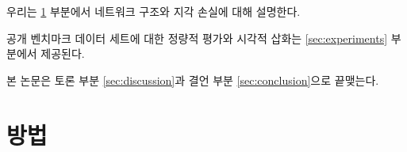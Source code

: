 \documentclass[10pt,twocolumn,letterpaper]{article}
\newcommand{\kor}[1]{#1}
\newcommand{\eng}[1]{}
\newcommand{\summary}[1]{}
\begin{document}

\eng{
We describe the network architecture and the perceptual loss in Section \ref{sec:method}.
}\kor{
우리는 \ref{sec:method} 부분에서 네트워크 구조와 지각 손실에 대해 설명한다.
} \eng{
A quantitative evaluation on public benchmark datasets as well as visual illustrations are provided in Section \ref{sec:experiments}.
}\kor{
공개 벤치마크 데이터 세트에 대한 정량적 평가와 시각적 삽화는 \ref{sec:experiments} 부분에서 제공된다.
} \eng{
The paper concludes with a discussion in Section \ref{sec:discussion} and concluding remarks in Section \ref{sec:conclusion}.
}\kor{
본 논문은 토론 부분 \ref{sec:discussion}과 결언 부분 \ref{sec:conclusion}으로 끝맺는다.
}

\summary{
구조, 평가, 결론에 대한 간단한 설명
}

\section{\eng{Method}\kor{방법}}
\label{sec:method}
\end{document}
